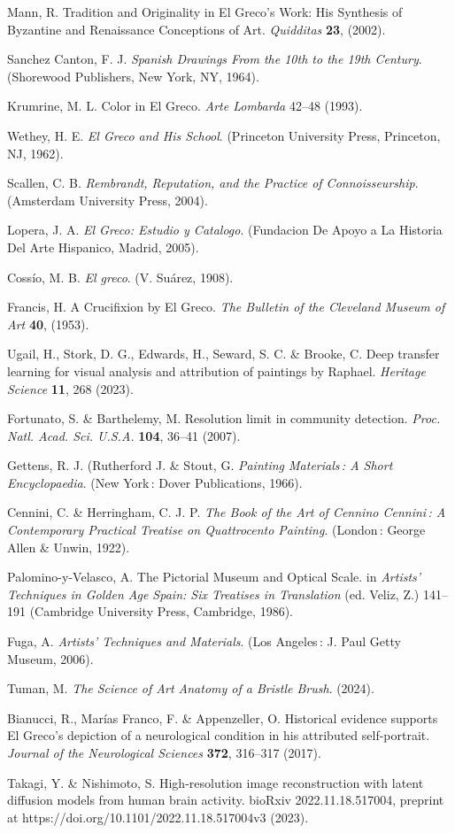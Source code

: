\documentclass[11pt]{article}
\begin{document}
\begin{thebibliography}{42}
Mann, R. Tradition and Originality in El Greco's Work: His Synthesis
of Byzantine and Renaissance Conceptions of Art. \emph{Quidditas}
\textbf{23}, (2002).

Sanchez Canton, F. J. \emph{Spanish Drawings From the 10th to the
19th Century}. (Shorewood Publishers, New York, NY, 1964).

Krumrine, M. L. Color in El Greco. \emph{Arte Lombarda} 42--48
(1993).

Wethey, H. E. \emph{El Greco and His School}. (Princeton University
Press, Princeton, NJ, 1962).

Scallen, C. B. \emph{Rembrandt, Reputation, and the Practice of
Connoisseurship}. (Amsterdam University Press, 2004).

Lopera, J. A. \emph{El Greco: Estudio y Catalogo}. (Fundacion De
Apoyo a La Historia Del Arte Hispanico, Madrid, 2005).

Cossío, M. B. \emph{El greco}. (V. Suárez, 1908).

Francis, H. A Crucifixion by El Greco. \emph{The Bulletin of the
Cleveland Museum of Art} \textbf{40}, (1953).

Ugail, H., Stork, D. G., Edwards, H., Seward, S. C. \& Brooke, C.
Deep transfer learning for visual analysis and attribution of paintings
by Raphael. \emph{Heritage Science} \textbf{11}, 268 (2023).

Fortunato, S. \& Barthelemy, M. Resolution limit in community
detection. \emph{Proc. Natl. Acad. Sci. U.S.A.} \textbf{104}, 36--41
(2007).

Gettens, R. J. (Rutherford J. \& Stout, G. \emph{Painting
Materials\,: A Short Encyclopaedia}. (New York\,: Dover Publications,
1966).

Cennini, C. \& Herringham, C. J. P. \emph{The Book of the Art of
Cennino Cennini\,: A Contemporary Practical Treatise on Quattrocento
Painting}. (London\,: George Allen \& Unwin, 1922).

Palomino-y-Velasco, A. The Pictorial Museum and Optical Scale. in
\emph{Artists' Techniques in Golden Age Spain: Six Treatises in
Translation} (ed. Veliz, Z.) 141--191 (Cambridge University Press,
Cambridge, 1986).

Fuga, A. \emph{Artists' Techniques and Materials}. (Los Angeles\,:
J. Paul Getty Museum, 2006).

Tuman, M. \emph{The Science of Art \textbar{} Anatomy of a Bristle Brush}.
(2024).

Bianucci, R., Marías Franco, F. \& Appenzeller, O. Historical
evidence supports El Greco's depiction of a neurological condition in
his attributed self-portrait. \emph{Journal of the Neurological
Sciences} \textbf{372}, 316--317 (2017).

Takagi, Y. \& Nishimoto, S. High-resolution image reconstruction
with latent diffusion models from human brain activity.
bioRxiv 2022.11.18.517004, preprint at https://doi.org/10.1101/2022.11.18.517004v3
(2023).

\end{thebibliography}
\end{document}

